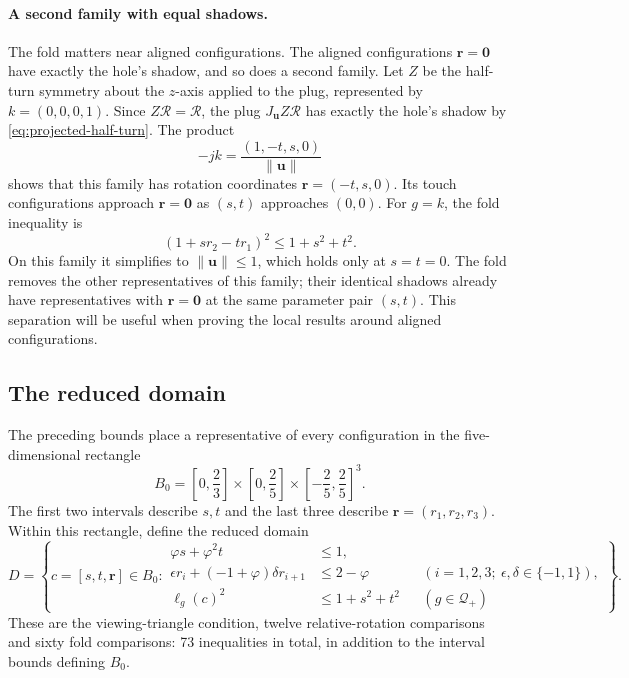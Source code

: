 \paragraph{A second family with equal shadows.}
The fold matters near aligned configurations. The aligned configurations
$\mathbf r=\mathbf0$ have exactly the hole's shadow, and so does a second
family. Let $Z$ be the half-turn symmetry
about the $z$-axis applied to the plug, represented by $k=(0,0,0,1)$.
Since $Z\mathcal R=\mathcal R$, the plug $J_{\mathbf u}Z\mathcal R$ has exactly the hole's shadow by
\cref{eq:projected-half-turn}. The product
\begin{equation}\label{eq:equal-shadow-rotation}
  -jk=\frac{(1,-t,s,0)}{\lVert\mathbf u\rVert}
\end{equation}
shows that this family has rotation coordinates $\mathbf r=(-t,s,0)$.
Its touch configurations approach $\mathbf r=\mathbf0$ as $(s,t)$
approaches $(0,0)$. For $g=k$, the fold inequality is
\[
  {(1+sr_2-tr_1)}^2\le1+s^2+t^2.
\]
On this family it simplifies to $\lVert\mathbf u\rVert\le1$, which holds
only at $s=t=0$.
The fold removes the other representatives of this family; their identical
shadows already have representatives with $\mathbf r=\mathbf0$ at the
same parameter pair $(s,t)$. This separation will be useful when proving the local results
around aligned configurations.

\subsection{The reduced domain}\label{subsec:the-reduced-domain}

The preceding bounds place a representative of every configuration in the
five-dimensional rectangle
\begin{equation}\label{eq:search-rectangle}
  B_0=\left[0,\frac23\right]\times\left[0,\frac25\right]
       \times{\left[-\frac25,\frac25\right]}^3.
\end{equation}
The first two intervals describe $s,t$ and the last three describe
$\mathbf r=(r_1,r_2,r_3)$. Within this rectangle, define the reduced domain
\begin{equation}\label{eq:reduced-domain}
  D=\left\{c=[s,t,\mathbf r]\in B_0:
  \begin{aligned}
    \varphi s+\varphi^2t&\le1,\\
    \epsilon r_i+(-1+\varphi)\delta r_{i+1}&\le2-\varphi
      &&(i=1,2,3;\ \epsilon,\delta\in\{-1,1\}),\\
    {\ell_g(c)}^2&\le1+s^2+t^2 &&(g\in\mathcal Q_+)
  \end{aligned}\right\}.
\end{equation}
These are the viewing-triangle condition, twelve relative-rotation
comparisons and sixty fold comparisons: 73 inequalities in total, in
addition to the interval bounds defining $B_0$.


